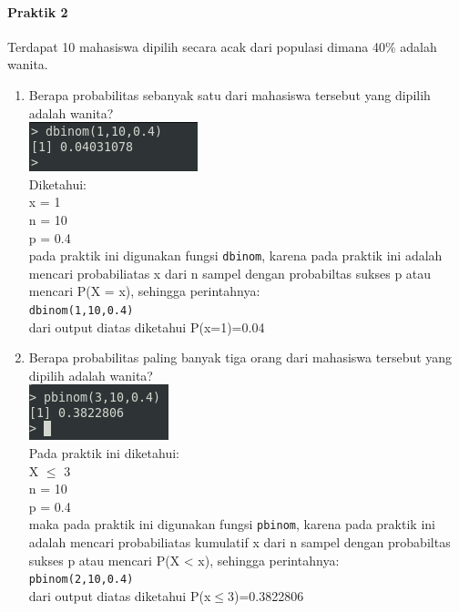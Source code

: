 \documentclass[a4paper,12pt]{article}
\begin{document}
\begin{enumerate}[label=\textbf{\Alph*.}]
\paragraph{Praktik 2\\}
Terdapat 10 mahasiswa dipilih secara acak dari populasi dimana 40\% adalah wanita.
\begin{enumerate}[label=\alph*.]
	\item Berapa probabilitas sebanyak satu dari mahasiswa tersebut yang dipilih adalah
	wanita?\\
	\includegraphics[scale=1]{praka2a}\\
	Diketahui:\\
	x = 1\\
	n = 10\\
	p = 0.4\\
	pada praktik ini digunakan fungsi \texttt{dbinom}, karena pada praktik ini adalah mencari probabiliatas x dari n sampel dengan
	probabiltas sukses p atau mencari P(X = x), sehingga perintahnya:\\
	\texttt{dbinom(1,10,0.4)}\\
	dari output diatas diketahui P(x=1)=0.04
	
	\item Berapa probabilitas paling banyak tiga orang dari mahasiswa tersebut yang dipilih
	adalah wanita?\\
	\includegraphics[scale=1]{praka2b}\\
	Pada praktik ini diketahui:\\
	X $\leq$ 3\\
	n = 10\\
	p = 0.4\\
	maka pada praktik ini digunakan fungsi \texttt{pbinom}, karena pada praktik ini adalah mencari probabiliatas kumulatif x dari n sampel
	dengan probabiltas sukses p atau mencari P(X < x), sehingga perintahnya:\\
	\texttt{pbinom(2,10,0.4)}\\
	dari output diatas diketahui P(x$\leq$3)=0.3822806
\end{enumerate}


\end{enumerate}
\end{document}
